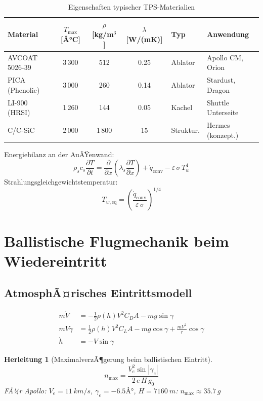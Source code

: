 ﻿\documentclass[12pt,a4paper]{article}
\newtheorem{herleitung}{Herleitung}[section]
\begin{document}
\begin{table}[H]
\centering
\caption{Eigenschaften typischer TPS-Materialien}
\label{tab:tps_mat}
\begin{tabular}{lcccll}
\toprule
\textbf{Material} & $T_{\max}$ [Â°C] & $\rho$ [kg/m$^3$] &
$\lambda$ [W/(mK)] & \textbf{Typ} & \textbf{Anwendung}\\
\midrule
AVCOAT 5026-39    & 3\,300 & 512  & 0.25 & Ablator    & Apollo CM, Orion\\
PICA (Phenolic)   & 3\,000 & 260  & 0.14 & Ablator    & Stardust, Dragon\\
LI-900 (HRSI)     & 1\,260 & 144  & 0.05 & Kachel     & Shuttle Unterseite\\
C/C-SiC           & 2\,000 & 1\,800 & 15  & Struktur. & Hermes (konzept.)\\
\bottomrule
\end{tabular}
\end{table}

Energiebilanz an der AuÃŸenwand:
\[
  \rho_s c_s \frac{\partial T}{\partial t}
    = \frac{\partial}{\partial x}\!\left(\lambda_s \frac{\partial T}{\partial x}\right)
    + \dot{q}_{\mathrm{conv}} - \varepsilon\,\sigma\,T_w^4
\]
Strahlungsgleichgewichtstemperatur:
\[
  T_{w,\mathrm{eq}} = \left(\frac{\dot{q}_{\mathrm{conv}}}{\varepsilon\,\sigma}\right)^{1/4}
\]

\section{Ballistische Flugmechanik beim Wiedereintritt}

\subsection{AtmosphÃ¤risches Eintrittsmodell}

\begin{align}
  m\dot{V} &= -\frac{1}{2}\rho(h) V^2 C_D A - mg\sin\gamma\\
  mV\dot{\gamma} &= \frac{1}{2}\rho(h) V^2 C_L A - mg\cos\gamma
    + \frac{mV^2}{r}\cos\gamma\\
  \dot{h} &= -V\sin\gamma
\end{align}

\begin{herleitung}[MaximalverzÃ¶gerung beim ballistischen Eintritt]
\[
  \boxed{n_{\max} = \frac{V_e^2\sin|\gamma_e|}{2\,e\,H\,g_0}}
\]
FÃ¼r Apollo: $V_e = \SI{11}{km/s}$, $\gamma_e = -6.5Â°$, $H = \SI{7160}{m}$:
$n_{\max} \approx 35.7\,g$
\end{herleitung}
\end{document}
